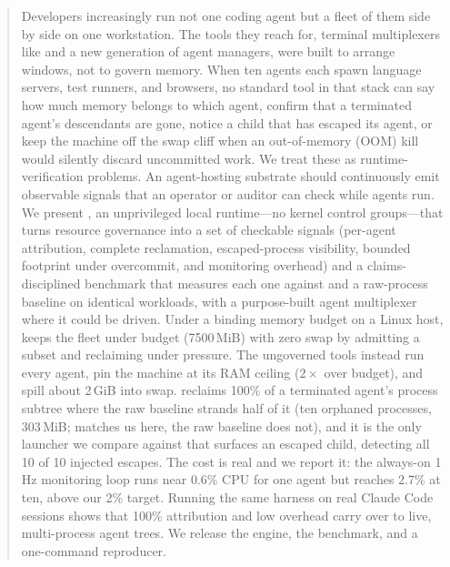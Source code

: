 
\begin{abstract}
Developers increasingly run not one coding agent but a fleet of them side by side on one
workstation. The tools they reach for, terminal multiplexers like  and a new generation of
agent managers, were built to arrange windows, not to govern memory. When ten agents each spawn
language servers, test runners, and browsers, no standard tool in that stack can say how much memory
belongs to which agent, confirm that a terminated agent's descendants are gone, notice a child that
has escaped its agent, or keep the machine off the swap cliff when an out-of-memory (OOM) kill would silently discard
uncommitted work. We treat these as runtime-verification problems. An agent-hosting substrate should
continuously emit observable signals that an operator or auditor can check while agents run. We
present \sys{}, an unprivileged local runtime---no kernel control groups---that turns resource
governance into a set of checkable signals
(per-agent attribution, complete reclamation, escaped-process visibility, bounded footprint under
overcommit, and monitoring overhead) and a claims-disciplined benchmark that measures each one against
 and a raw-process baseline on identical workloads, with a purpose-built agent multiplexer
where it could be driven.
Under a binding memory budget on a Linux host, \sys{} keeps the fleet under budget (7500\,MiB) with zero
swap by admitting a subset and reclaiming under pressure. The ungoverned tools instead run every agent,
pin the machine at its RAM ceiling ($2\times$ over budget), and spill about 2\,GiB into swap. \sys{}
reclaims 100\% of a terminated agent's process subtree where the raw baseline strands half of it (ten
orphaned processes, 303\,MiB;  matches us here, the raw baseline does not), and it is the
only launcher we compare against that surfaces an escaped child, detecting all
10 of 10 injected escapes. The cost is real and we report it: the always-on 1\,Hz monitoring loop
runs near 0.6\% CPU for one agent but reaches 2.7\% at ten, above our 2\% target. Running the same
harness on real Claude Code sessions shows that 100\% attribution and low overhead carry over to live,
multi-process agent trees. We release the engine, the benchmark, and a one-command reproducer.
\end{abstract}

